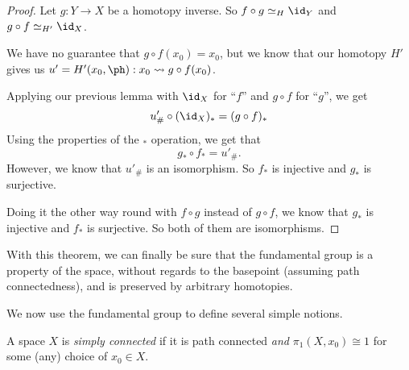\documentclass[a4paper]{article}
\begin{document}
\begin{proof}
  Let $g: Y\to X$ be a homotopy inverse. So $f\circ g\simeq_H \id_Y$ and $g\circ f\simeq_{H'} \id_X$.
  \begin{center}
  \end{center}
  We have no guarantee that $g\circ f(x_0) = x_0$, but we know that our homotopy $H'$ gives us $u' = H'(x_0, \ph): x_0 \leadsto g\circ f(x_0)$.

  Applying our previous lemma with $\id_X$ for ``$f$'' and $g \circ f$ for ``$g$'', we get
  \[
    u'_\# \circ (\id_X)_* = (g\circ f)_*
  \]
  Using the properties of the $_*$ operation, we get that
  \[
    g_*\circ f_* = u'_\#.
  \]
  However, we know that $u'_\#$ is an isomorphism. So $f_*$ is injective and $g_*$ is surjective.

  Doing it the other way round with $f\circ g$ instead of $g\circ f$, we know that $g_*$ is injective and $f_*$ is surjective. So both of them are isomorphisms.
\end{proof}
With this theorem, we can finally be sure that the fundamental group is a property of the space, without regards to the basepoint (assuming path connectedness), and is preserved by arbitrary homotopies.

We now use the fundamental group to define several simple notions.
\begin{defi}
  A space $X$ is \emph{simply connected} if it is path connected \emph{and} $\pi_1(X, x_0) \cong 1$ for some (any) choice of $x_0 \in X$.
\end{defi}
\end{document}
